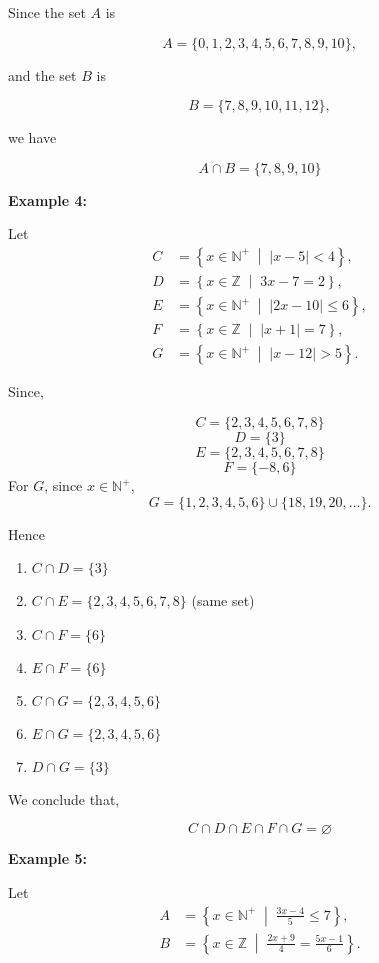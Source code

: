 \documentclass[12pt,a4paper,openany]{article}
\begin{document}
Since the set $A$ is

\[
A = \{0, 1, 2, 3, 4, 5, 6, 7, 8, 9, 10\},
\]

and the set $B$ is

\[
B = \{7, 8, 9, 10, 11, 12\},
\]

we have

\[
\boxed{A \cap B = \{7, 8, 9, 10\}}
\]

\textbf{Example 4:}

Let  
\[
\begin{aligned}
C &= \left\{ x \in \mathbb{N}^+ \;\middle|\; |x - 5| < 4 \right\}, \\
D &= \left\{ x \in \mathbb{Z} \;\middle|\; 3x - 7 = 2 \right\}, \\
E &= \left\{ x \in \mathbb{N}^+ \;\middle|\; |2x - 10| \le 6 \right\}, \\
F &= \left\{ x \in \mathbb{Z} \;\middle|\; |x + 1| = 7 \right\}, \\
G &= \left\{ x \in \mathbb{N}^+ \;\middle|\; |x - 12| > 5 \right\}.
\end{aligned}
\]

Since,

\[
C = \{2,3,4,5,6,7,8\}
\]
\[
D = \{3\}
\]
\[
E = \{2,3,4,5,6,7,8\}
\]
\[
F = \{-8, 6\}
\]
For $G$, since $x \in \mathbb{N}^+$,  
\[
G = \{1,2,3,4,5,6\} \cup \{18,19,20,\dots\}.
\]

Hence

\begin{enumerate}
    \item $C \cap D = \{3\}$
    \item $C \cap E = \{2,3,4,5,6,7,8\}$ (same set)
    \item $C \cap F = \{6\}$
    \item $E \cap F = \{6\}$
    \item $C \cap G = \{2,3,4,5,6\}$
    \item $E \cap G = \{2,3,4,5,6\}$
    \item $D \cap G = \{3\}$
\end{enumerate}

We conclude that,

\[
\boxed{C \cap D \cap E \cap F \cap G = \varnothing}
\]

\textbf{Example 5:}

Let  
\[
\begin{aligned}
A &= \left\{ x \in \mathbb{N}^+ \;\middle|\; \frac{3x - 4}{5} \le 7 \right\}, \\
B &= \left\{ x \in \mathbb{Z} \;\middle|\; \frac{2x + 9}{4} = \frac{5x - 1}{6} \right\}.
\end{aligned}
\]
\end{document}
